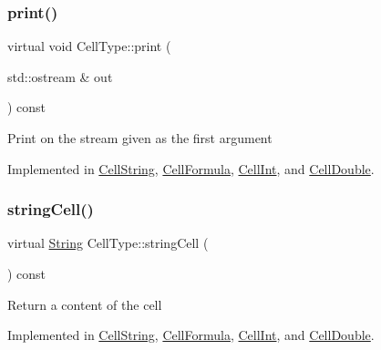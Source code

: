 \mbox{\label{class_cell_type_a34413fcb76f292b6b8d08615765ba894}} 
\subsubsection{\texorpdfstring{print()}{print()}}
{\footnotesize\ttfamily virtual void Cell\+Type\+::print (\begin{DoxyParamCaption}\item[{std\+::ostream \&}]{out }\end{DoxyParamCaption}) const\hspace{0.3cm}{\ttfamily [pure virtual]}}

Print on the stream given as the first argument 

Implemented in \hyperlink{class_cell_string_a13f416bd887f2cbceb93273316d16d65}{Cell\+String}, \hyperlink{class_cell_formula_ac8cfeff2585811ee01acb7a4ddf25723}{Cell\+Formula}, \hyperlink{class_cell_int_a1cb8461721999308790d105adff41cd2}{Cell\+Int}, and \hyperlink{class_cell_double_a90539ceb6daa29e7b658d8f2a2d1445d}{Cell\+Double}.

\mbox{\label{class_cell_type_abba4d6d43efa340144d1ad09637e1aa9}} 
\subsubsection{\texorpdfstring{string\+Cell()}{stringCell()}}
{\footnotesize\ttfamily virtual \hyperlink{class_string}{String} Cell\+Type\+::string\+Cell (\begin{DoxyParamCaption}{ }\end{DoxyParamCaption}) const\hspace{0.3cm}{\ttfamily [pure virtual]}}

Return a content of the cell 

Implemented in \hyperlink{class_cell_string_ac601c93ecb70391eae65236c56c561a5}{Cell\+String}, \hyperlink{class_cell_formula_abe70a7ace4b58fe4154bacccb5e3c12c}{Cell\+Formula}, \hyperlink{class_cell_int_ae6b32857bc96f305fff4226c988032d4}{Cell\+Int}, and \hyperlink{class_cell_double_a3e92f9ec4b564b3e14fa829529bbaf0a}{Cell\+Double}.

\mbox{\label{class_cell_type_ae31acfe1efc7776796d85918886247af}} 
